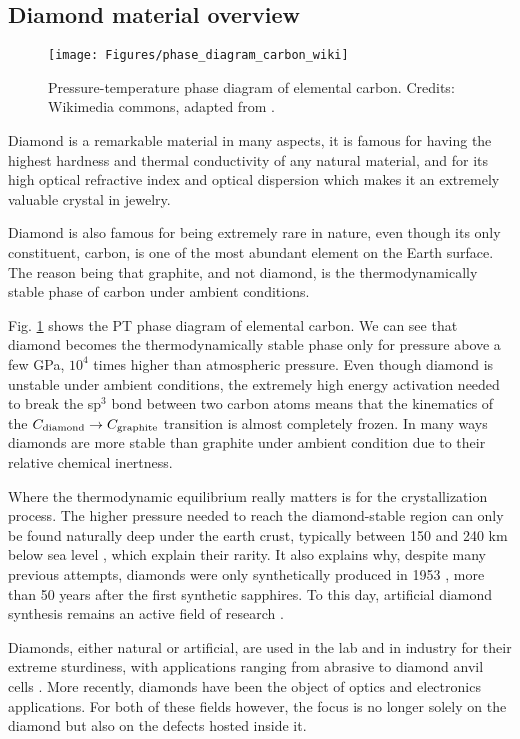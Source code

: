 \documentclass[a4paper,11pt]{report}
\begin{document}
\subsection{Diamond material overview}
\begin{figure}[h!]
\centering
\texttt{[image: Figures/phase\_diagram\_carbon\_wiki]}
\caption{Pressure-temperature phase diagram of elemental carbon. Credits: Wikimedia commons, adapted from \citep{bundy1989pressure, bundy1996pressure}.}
\label{carbon phase diagram}
\end{figure}

Diamond is a remarkable material in many aspects, it is famous for having the highest hardness and thermal conductivity of any natural material, and for its high optical refractive index and optical dispersion which makes it an extremely valuable crystal in jewelry.

Diamond is also famous for being extremely rare in nature, even though its only constituent, carbon, is one of the most abundant element on the Earth surface. The reason being that graphite, and not diamond, is the thermodynamically stable phase of carbon under ambient conditions.

Fig. \ref{carbon phase diagram} shows the PT phase diagram of elemental carbon. We can see that diamond becomes the thermodynamically stable phase only for pressure above a few GPa, $10^4$ times higher than atmospheric pressure. Even though diamond is unstable under ambient conditions, the extremely high energy activation needed to break the sp$^3$ bond between two carbon atoms means that the kinematics of the $C_{\rm diamond} \to C_{\rm graphite}$ transition is almost completely frozen. In many ways diamonds are more stable than graphite under ambient condition due to their relative chemical inertness.

Where the thermodynamic equilibrium really matters is for the crystallization process. The higher pressure needed to reach the diamond-stable region can only be found naturally deep under the earth crust, typically between 150 and 240 km below sea level \citep{tappert2011diamonds}, which explain their rarity. It also explains why, despite many previous attempts, diamonds were only synthetically produced in 1953 \citep{barnard2000diamond}, more than 50 years after the first synthetic sapphires. To this day, artificial diamond synthesis remains an active field of research \citep{shenderova2019synthesis, achard2020chemical}.

Diamonds, either natural or artificial, are used in the lab and in industry for their extreme sturdiness, with applications ranging from abrasive to diamond anvil cells \citep{jayaraman1983diamond}. More recently, diamonds have been the object of optics and electronics applications. For both of these fields however, the focus is no longer solely on the diamond but also on the defects hosted inside it.
\end{document}
